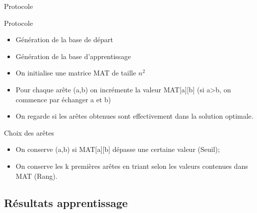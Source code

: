 \documentclass{beamer}
\begin{document}
\begin{frame}{Protocole}

\begin{exampleblock}{Protocole}
\begin{itemize}
\item Génération de la base de départ
\item Génération de la base d'apprentissage
\item On initialise une matrice MAT de taille $n^2$
\item Pour chaque arête (a,b) on incrémente la valeur MAT[a][b] (si a>b, on commence par échanger a et b)
\item On regarde si les arêtes obtenues sont effectivement dans la solution optimale.
\end{itemize}
\end{exampleblock}

\begin{block}{Choix des arêtes}
\begin{itemize}
\item On conserve (a,b) si MAT[a][b] dépasse une certaine valeur (Seuil);
\item On conserve les k premières arêtes en triant selon les valeurs contenues dans MAT (Rang).
\end{itemize}
\end{block}

\end{frame}

\subsection{Résultats apprentissage}
\end{document}
